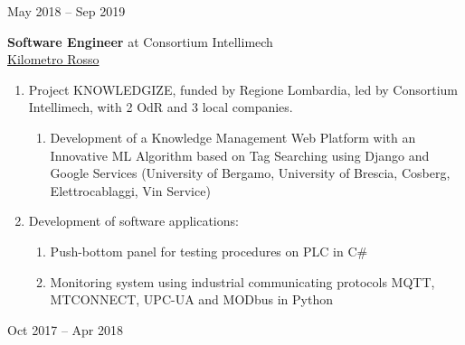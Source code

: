 \documentclass[10pt]{article}
\begin{document}
\hfill\vrule\hfill
\begin{minipage}[t]{.16\textwidth}
	\raggedleft
	May 2018 – Sep 2019
\end{minipage}

\vspace{6pt} %

\noindent
\begin{minipage}[t]{.8\textwidth}
	\raggedright
	\textbf{Software Engineer} at Consortium Intellimech\\
	\href{https://www.linkedin.com/company/kilometro-rosso/}{Kilometro Rosso}
	\vspace{6pt}
	\begin{enumerate}
		\item Project KNOWLEDGIZE, funded by Regione Lombardia, led by Consortium Intellimech, with 2 OdR and 3 local companies.
		  \begin{enumerate}
			\item Development of a Knowledge Management Web Platform with an Innovative ML Algorithm based on Tag Searching using Django and Google Services (University of Bergamo, University of Brescia, Cosberg, Elettrocablaggi, Vin Service)
		\end{enumerate}
		\item Development of software applications:
		  \begin{enumerate}
			\item Push-bottom panel for testing procedures on PLC in C\#
			\item Monitoring system using industrial communicating protocols MQTT, MTCONNECT, UPC-UA and MODbus in Python
		\end{enumerate}
  \end{enumerate}
\end{minipage}%
\hfill\vrule\hfill
\begin{minipage}[t]{.16\textwidth}
	\raggedleft
	Oct 2017 – Apr 2018
\end{minipage}

\clearpage

\end{document}
